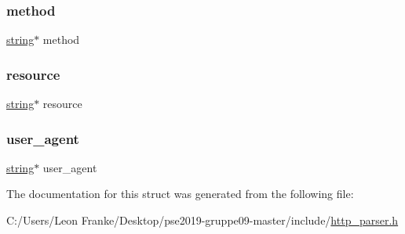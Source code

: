 \mbox{\label{structhttp__request_a594173f80b9975fd3ba5394b63ebc509}} 
\subsubsection{\texorpdfstring{method}{method}}
{\footnotesize\ttfamily \mbox{\hyperlink{structstring}{string}}$\ast$ method}

\mbox{\label{structhttp__request_a09aa4e1a1b2609255ee841c0607d8bea}} 
\subsubsection{\texorpdfstring{resource}{resource}}
{\footnotesize\ttfamily \mbox{\hyperlink{structstring}{string}}$\ast$ resource}

\mbox{\label{structhttp__request_a97532af77bd6e59b976a10402660d112}} 
\subsubsection{\texorpdfstring{user\+\_\+agent}{user\_agent}}
{\footnotesize\ttfamily \mbox{\hyperlink{structstring}{string}}$\ast$ user\+\_\+agent}



The documentation for this struct was generated from the following file\+:\begin{DoxyCompactItemize}
\item 
C\+:/\+Users/\+Leon Franke/\+Desktop/pse2019-\/gruppe09-\/master/include/\mbox{\hyperlink{http__parser_8h}{http\+\_\+parser.\+h}}\end{DoxyCompactItemize}
